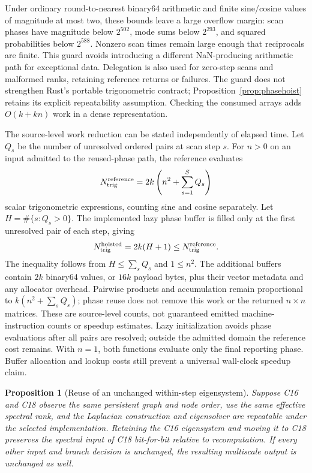 \documentclass[11pt,a4paper]{article}
\newtheorem{proposition}[theorem]{Proposition}
\theoremstyle{definition}\newtheorem{definition}[theorem]{Definition}
\begin{document}
Under ordinary round-to-nearest binary64 arithmetic and finite sine/cosine values of magnitude at most two, these bounds leave a large overflow margin: scan phases have magnitude below $2^{502}$, mode sums below $2^{293}$, and squared probabilities below $2^{588}$. Nonzero scan times remain large enough that reciprocals are finite. This guard avoids introducing a different NaN-producing arithmetic path for exceptional data. Delegation is also used for zero-step scans and malformed ranks, retaining reference returns or failures. The guard does not strengthen Rust's portable trigonometric contract; Proposition~\ref{prop:phasehoist} retains its explicit repeatability assumption. Checking the consumed arrays adds $O(k+kn)$ work in a dense representation.

The source-level work reduction can be stated independently of elapsed time.
Let $Q_s$ be the number of unresolved ordered pairs at scan step $s$.
For $n>0$ on an input admitted to the reused-phase path, the reference evaluates
\[
 N_{\rm trig}^{\rm reference}
   =2k\left(n^2+\sum_{s=1}^{S}Q_s\right)
\]
scalar trigonometric expressions, counting sine and cosine separately.  Let
$H=\#\{s:Q_s>0\}$.  The implemented lazy phase buffer is filled only at the
first unresolved pair of each step, giving
\[
 N_{\rm trig}^{\rm hoisted}=2k(H+1)
 \leq N_{\rm trig}^{\rm reference}.
\]
The inequality follows from $H\leq\sum_s Q_s$ and $1\leq n^2$.  The
additional buffers contain $2k$
binary64 values, or $16k$ payload bytes, plus their vector metadata and any
allocator overhead.  Pairwise products and accumulation remain proportional
to $k(n^2+\sum_s Q_s)$; phase reuse does not remove this work or the returned
$n\times n$ matrices.  These are source-level counts, not guaranteed emitted
machine-instruction counts or speedup estimates.  Lazy initialization avoids
phase evaluations after all pairs are resolved; outside the admitted domain the reference cost remains. With $n=1$, both functions
evaluate only the final reporting phase.  Buffer allocation and lookup costs
still prevent a universal wall-clock speedup claim.

\begin{proposition}[Reuse of an unchanged within-step eigensystem]
\label{prop:sharedspectrum}
Suppose C16 and C18 observe the same persistent graph and node order, use the
same effective spectral rank, and the Laplacian construction and eigensolver
are repeatable under the selected implementation.  Retaining the C16
eigensystem and moving it to C18 preserves the spectral input of C18
bit-for-bit relative to recomputation.  If every other input and branch
decision is unchanged, the resulting multiscale output is unchanged as well.
\end{proposition}
\end{document}

